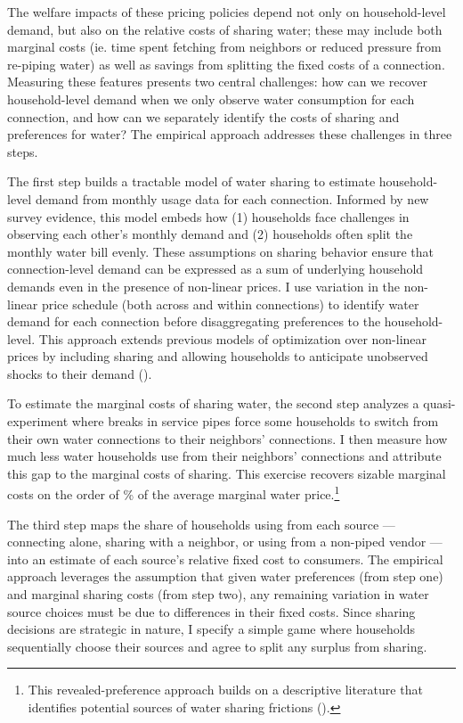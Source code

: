 \documentclass[12pt]{article}
\begin{document}
The welfare impacts of these pricing policies depend not only on household-level demand, but also on the relative costs of sharing water; these may include both marginal costs (ie. time spent fetching from neighbors or reduced pressure from re-piping water) as well as savings from splitting the fixed costs of a connection.  Measuring these features presents two central challenges: how can we recover household-level demand when we only observe water consumption for each connection, and how can we separately identify the costs of sharing and preferences for water?  The empirical approach addresses these challenges in three steps. 

The first step builds a tractable model of water sharing to estimate household-level demand from monthly usage data for each connection.  Informed by new survey evidence, this model embeds how (1) households face challenges in observing each other's monthly demand and (2) households often split the monthly water bill evenly.  These assumptions on sharing behavior ensure that connection-level demand can be expressed as a sum of underlying household demands even in the presence of non-linear prices.  I use variation in the non-linear price schedule (both across and within connections) to identify water demand for each connection before disaggregating preferences to the household-level.  This approach extends previous models of optimization over non-linear prices by including sharing and allowing households to anticipate unobserved shocks to their demand (\cite{moffitt1986econometrics,burtless1978effect}).

To estimate the marginal costs of sharing water, the second step analyzes a quasi-experiment where breaks in service pipes force some households to switch from their own water connections to their neighbors' connections.  I then measure how much less water households use from their neighbors' connections and attribute this gap to the marginal costs of sharing.  This exercise recovers sizable marginal costs on the order of \unskip\% of the average marginal water price.\footnote{This revealed-preference approach builds on a descriptive literature that identifies potential sources of water sharing frictions (\cite{whittington1992possible,nauges2006water}).}

The third step maps the share of households using from each source --- connecting alone, sharing with a neighbor, or using from a non-piped vendor --- into an estimate of each source's relative fixed cost to consumers.  The empirical approach leverages the assumption that given water preferences (from step one) and marginal sharing costs (from step two), any remaining variation in water source choices must be due to differences in their fixed costs.  Since sharing decisions are strategic in nature, I specify a simple game where households sequentially choose their sources and agree to split any surplus from sharing.  
\end{document}
